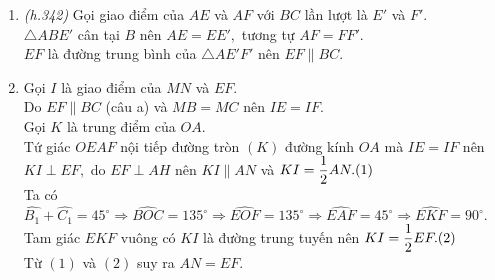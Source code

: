 \begin{bt}
{  \begin{enumerate}
   \item \textit{(h.342)} Gọi giao điểm của $AE$ và $AF$ với $BC$ lần lượt là $E'$ và $F'.$\\
   $\triangle ABE'$ cân tại $B$ nên $AE=EE',$ tương tự $AF=FF'.$\\
   $EF$ là đường trung bình của $\triangle AE'F'$ nên $EF \parallel BC.$
   \item Gọi $I$ là giao điểm của $MN$ và $EF.$\\
   Do $EF \parallel BC$ (câu a) và $MB=MC$ nên $IE=IF.$\\
   Gọi $K$ là trung điểm của $OA.$\\
   Tứ giác $OEAF$ nội tiếp đường tròn $(K)$ đường kính $OA$ mà $IE=IF$ nên $KI \perp EF,$ do $EF \perp AH$ nên $KI \parallel AN$ và $KI = \dfrac{1}{2}AN. \hfill (1)$\\
   Ta có $\widehat{B_1}+\widehat{C_1}=45^\circ \Rightarrow \widehat{BOC}=135^\circ \Rightarrow \widehat{EOF}=135^\circ \Rightarrow \widehat{EAF}=45^\circ \Rightarrow \widehat{EKF}=90^\circ.$\\
   Tam giác $EKF$ vuông có $KI$ là đường trung tuyến nên $KI = \dfrac{1}{2}EF. \hfill (2)$\\
   Từ $(1)$ và $(2)$ suy ra $AN =EF.$
  \end{enumerate}
  }
\end{bt}
 

